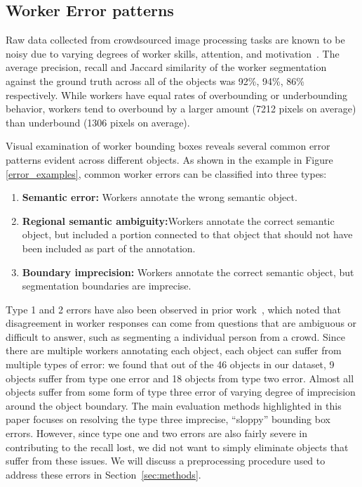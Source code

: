 \subsection{Worker Error patterns\label{sec:errors}}
\par Raw data collected from crowdsourced image processing tasks are known to be noisy due to varying degrees of worker skills, attention, and motivation~\cite{bell14intrinsic,MDWWelinder2010}. The average precision, recall and Jaccard similarity of the worker segmentation against the ground truth across all of the objects was 92\%, 94\%, 86\% respectively. While workers have equal rates of overbounding or underbounding behavior, workers tend to overbound by a larger amount (7212 pixels on average) than underbound (1306 pixels on average). %
\par Visual examination of worker bounding boxes reveals several common error patterns evident across different objects. As shown in the example in Figure \ref{error_examples}, common worker errors can be classified into three types:
\begin{enumerate}
	\item \textbf{Semantic error:} Workers annotate the wrong semantic object.
	\item \textbf{Regional semantic ambiguity:}Workers annotate the correct semantic object, but included a portion connected to that object that should not have been included as part of the annotation.
	\item \textbf{Boundary imprecision:} Workers annotate the correct semantic object, but segmentation boundaries are imprecise. %
\end{enumerate}
Type 1 and 2 errors have also been observed in prior work~\cite{Sorokin2008,Lin2014,Gurari2018}, which noted that disagreement in worker responses can come from questions that are ambiguous or difficult to answer, such as segmenting a individual person from a crowd. Since there are multiple workers annotating each object, each object can suffer from multiple types of error: we found that out of the 46 objects in our dataset, 9 objects suffer from type one error and 18 objects from type two error. Almost all objects suffer from some form of type three error of varying degree of imprecision around the object boundary. The main evaluation methods highlighted in this paper focuses on resolving the type three imprecise, ``sloppy'' bounding box errors. However, since type one and two errors are also fairly severe in contributing to the recall lost, we did not want to simply eliminate objects that suffer from these issues. We will discuss a preprocessing procedure used to address these errors in Section~\ref{sec:methods}.

